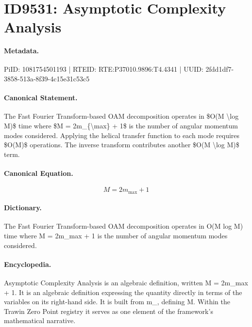 \section*{ID9531: Asymptotic Complexity Analysis}
\paragraph{Metadata.}
PiID: 1081754501193 | RTEID: RTE:P37010.9896:T4.4341 | UUID: 2fdd1df7-3858-513a-8f39-4c15e31c53c5

\paragraph{Canonical Statement.}
The Fast Fourier Transform-based OAM decomposition operates in \$O(M \textbackslash{}log M)\$ time where \$M = 2m\_\{\textbackslash{}max\} + 1\$ is the number of angular momentum modes considered. Applying the helical transfer function to each mode requires \$O(M)\$ operations. The inverse transform contributes another \$O(M \textbackslash{}log M)\$ term.

\paragraph{Canonical Equation.}
\[
M = 2m_{\max} + 1
\]

\paragraph{Dictionary.}
The Fast Fourier Transform-based OAM decomposition operates in O(M log M) time where M = 2m\_max + 1 is the number of angular momentum modes considered.

\paragraph{Encyclopedia.}
Asymptotic Complexity Analysis is an algebraic definition, written M = 2m\_max + 1. It is an algebraic definition expressing the quantity directly in terms of the variables on its right-hand side. It is built from m\_, defining M. Within the Trawin Zero Point registry it serves as one element of the framework's mathematical narrative.
